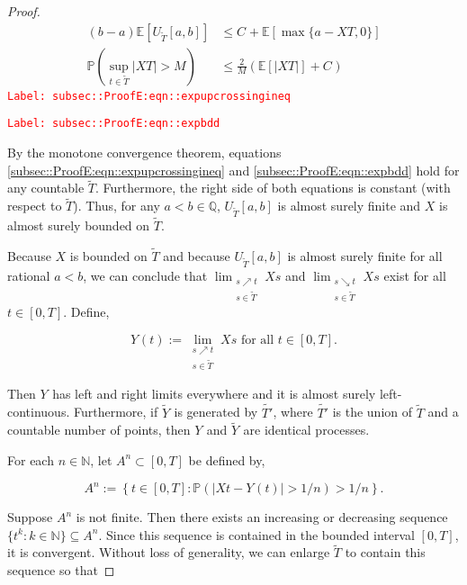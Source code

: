 \documentclass[12pt]{article}
\newcommand{\mb}{\mathbb}
\newcommand{\te}{\text}
\newcommand{\tr}{\textcolor{red}}
\newcommand{\labe}[1]{\tr{\texttt{Label: #1}}}
\newcommand{\ind}{\hspace{24pt}}
\newcommand{\pr}{\mb{P}}							%
\newcommand{\ex}[1]{\mb{E}\left[#1\right]}			%
\newcommand{\T}{T}								%
\renewcommand{\t}{t}							%
\renewcommand{\tt}{s}							%
\newcommand{\X}{X}								%
\newcommand{\pup}[1]{^{#1}}							%
\renewcommand{\it}{k}								%
\newcommand{\numb}{n}								%
\newcommand{\rxvtt}[2]{Y_{#1}{(#2)}}				%
\newcommand{\rxvtts}[2]{Y_{#1}{#2}}					%
\newcommand{\const}[1]{C_{#1}}						%
\newcommand{\alt}{\widetilde}						%
\newcommand{\typset}{A}							%
\begin{document}
\begin{proof}
\begin{align}
(b-a)\ex{U_{\alt{T}}[a,b]} &\leq \const{} + \ex{\max\{a-\X{}{\T},0\}}
\label{subsec::ProofE:eqn::expupcrossingineq}\\
\pr\left(\sup_{\t\in\alt{T}} |\X{}{\T}| > M\right) &\leq \frac{2}{M}\left(\ex{|\X{}{\T}|} + \const{}\right)
\label{subsec::ProofE:eqn::expbdd}
\end{align}
\labe{subsec::ProofE:eqn::expupcrossingineq}

\labe{subsec::ProofE:eqn::expbdd}

By the monotone convergence theorem, equations \eqref{subsec::ProofE:eqn::expupcrossingineq} and \eqref{subsec::ProofE:eqn::expbdd} hold for any countable \(\alt{T}\). Furthermore, the right side of both equations is constant (with respect to \(\alt{T}\)). Thus, for any \(a < b \in \mb{Q}\), \(U_{\alt{T}}[a,b]\) is almost surely finite and \(\X{}{}\) is almost surely bounded on \(\alt{T}\).

\ind Because \(\X{}{}\) is bounded on \(\alt{T}\) and because \(U_{\alt{T}}[a,b]\) is almost surely finite for all rational \(a < b\), we can conclude that \(\lim_{\substack{\tt \nearrow \t\\ \tt \in \alt{T}}} \X{}{\tt}\) and \(\lim_{\substack{\tt \searrow \t\\ \tt \in \alt{T}}} \X{}{\tt}\) exist for all \(\t \in [0,\T]\). Define,

\[\rxvtt{}{\t} := \lim_{\substack{\tt \nearrow \t\\\tt \in \alt{T}}} \X{}{\tt}\te{ for all } \t \in [0,\T].\]

Then \(\rxvtts{}{}\) has left and right limits everywhere and it is almost surely left-continuous. Furthermore, if \(\alt{\rxvtts{}{}}\) is generated by \(\alt{T'}\), where \(\alt{T'}\) is the union of \(\alt{T}\) and a countable number of points, then \(\rxvtts{}{}\) and \(\alt{\rxvtts{}{}}\) are identical processes. 

\ind For each \(\numb \in \mb{N}\), let \(\typset\pup{\numb} \subset [0,\T]\) be defined by,

\[\typset\pup{\numb} := \left\{\t\in [0,\T]: \pr\left(|\X{}{\t} - \rxvtt{}{\t}| > 1/\numb\right) > 1/\numb\right\}.\] 

Suppose \(\typset\pup{\numb}\) is not finite. Then there exists an increasing or decreasing sequence \(\{\t\pup{\it}:\it\in \mb{N}\}\subseteq \typset\pup{\numb}\). Since this sequence is contained in the bounded interval \([0,\T]\), it is convergent. Without loss of generality, we can enlarge \(\alt{T}\) to contain this sequence so that


\end{proof}
\end{document}
